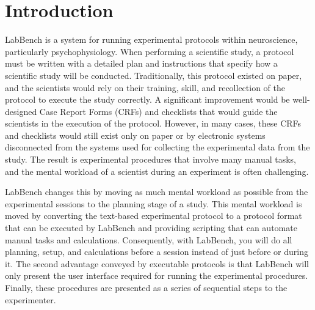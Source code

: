 \chapter{Introduction}
\label{ch:Introduction}

LabBench is a system for running experimental protocols within neuroscience, particularly psychophysiology. When performing a scientific study, a protocol must be written with a detailed plan and instructions that specify how a scientific study will be conducted. Traditionally, this protocol existed on paper, and the scientists would rely on their training, skill, and recollection of the protocol to execute the study correctly. A significant improvement would be well-designed Case Report Forms (CRFs) and checklists that would guide the scientists in the execution of the protocol. However, in many cases, these CRFs and checklists would still exist only on paper or by electronic systems disconnected from the systems used for collecting the experimental data from the study. The result is experimental procedures that involve many manual tasks, and the mental workload of a scientist during an experiment is often challenging.

LabBench changes this by moving as much mental workload as possible from the experimental sessions to the planning stage of a study. This mental workload is moved by converting the text-based experimental protocol to a protocol format that can be executed by LabBench and providing scripting that can automate manual tasks and calculations. Consequently, with LabBench, you will do all planning, setup, and calculations before a session instead of just before or during it. The second advantage conveyed by executable protocols is that LabBench will only present the user interface required for running the experimental procedures. Finally, these procedures are presented as a series of sequential steps to the experimenter.

